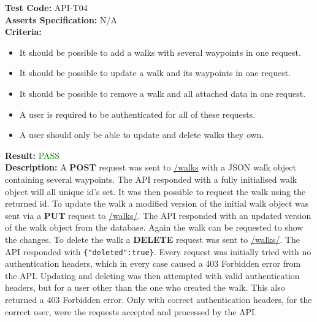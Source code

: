 \documentclass[11pt,a4paper]{report}
\begin{document}
\label{test:API-T04}
\noindent\textbf{Test Code:} API-T04\\
\textbf{Asserts Specification:} N/A \\ 
\textbf{Criteria:} \begin{itemize}
                     \item It should be possible to add a walks with several waypoints in one request.
                     \item It should be possible to update a walk and its waypoints in one request.
                     \item It should be possible to remove a walk and all attached data in one request.
                     \item A user is required to be authenticated for all of these requests.
                     \item A user should only be able to update and delete walks they own. 
                   \end{itemize}  
\textbf{Result:} \textcolor{green}{PASS}\\ 
\textbf{Description:} A \textbf{POST} request was sent to \url{/walks} with a JSON walk object containing several waypoints. The API responded with a fully initialised walk object will all unique id's set. It was then possible to request the walk using the returned id. To update the walk a modified version of the initial walk object was sent via a \textbf{PUT} request to \url{/walks/}. The API responded with an updated version of the walk object from the database. Again the walk can be requested to show the changes. To delete the walk a \textbf{DELETE} request was sent to \url{/walks/}. The API responded with \lstinline${"deleted":true}$. Every request was initially tried with no authentication headers, which in every case caused a 403 Forbidden error from the API. Updating and deleting was then attempted with valid authentication headers, but for a user other than the one who created the walk. This also returned a 403 Forbidden error. Only with correct authentication headers, for the correct user, were the requests accepted and processed by the API.\\
\end{document}
